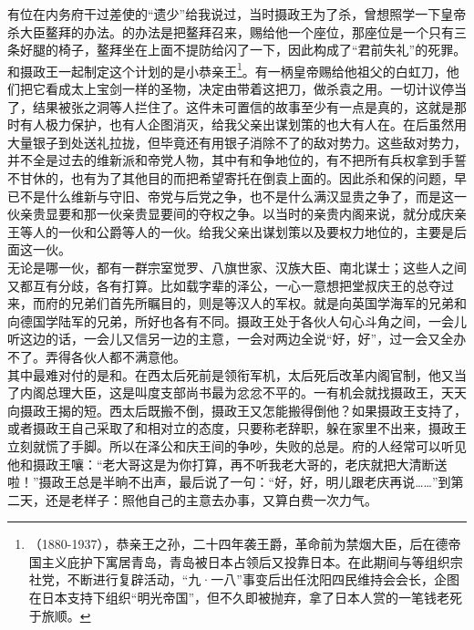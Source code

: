 有位在内务府干过差使的“遗少”给我说过，当时摄政王为了杀，曾想照学一下皇帝杀大臣鳌拜的办法。的办法是把鳌拜召来，赐给他一个座位，那座位是一个只有三条好腿的椅子，鳌拜坐在上面不提防给闪了一下，因此构成了“君前失礼”的死罪。和摄政王一起制定这个计划的是小恭亲王\footnote{（1880-1937），恭亲王之孙，二十四年袭王爵，革命前为禁烟大臣，后在德帝国主义庇护下寓居青岛，青岛被日本占领后又投靠日本。在此期间与等组织宗社党，不断进行复辟活动，“九·一八”事变后出任沈阳四民维持会会长，企图在日本支持下组织“明光帝国”，但不久即被抛弃，拿了日本人赏的一笔钱老死于旅顺。}。有一柄皇帝赐给他祖父的白虹刀，他们把它看成太上宝剑一样的圣物，决定由带着这把刀，做杀袁之用。一切计议停当了，结果被张之洞等人拦住了。这件未可置信的故事至少有一点是真的，这就是那时有人极力保护，也有人企图消灭，给我父亲出谋划策的也大有人在。在后虽然用大量银子到处送礼拉拢，但毕竟还有用银子消除不了的敌对势力。这些敌对势力，并不全是过去的维新派和帝党人物，其中有和争地位的，有不把所有兵权拿到手誓不甘休的，也有为了其他目的而把希望寄托在倒袁上面的。因此杀和保的问题，早已不是什么维新与守旧、帝党与后党之争，也不是什么满汉显贵之争了，而是这一伙亲贵显要和那一伙亲贵显要间的夺权之争。以当时的亲贵内阁来说，就分成庆亲王等人的一伙和公爵等人的一伙。给我父亲出谋划策以及要权力地位的，主要是后面这一伙。\\

无论是哪一伙，都有一群宗室觉罗、八旗世家、汉族大臣、南北谋士；这些人之间又都互有分歧，各有打算。比如载字辈的泽公，一心一意想把堂叔庆王的总夺过来，而府的兄弟们首先所瞩目的，则是等汉人的军权。就是向英国学海军的兄弟和向德国学陆军的兄弟，所好也各有不同。摄政王处于各伙人句心斗角之间，一会儿听这边的话，一会儿又信另一边的主意，一会对两边全说“好，好”，过一会又全办不了。弄得各伙人都不满意他。\\

其中最难对付的是和。在西太后死前是领衔军机，太后死后改革内阁官制，他又当了内阁总理大臣，这是叫度支部尚书最为忿忿不平的。一有机会就找摄政王，天天向摄政王揭的短。西太后既搬不倒，摄政王又怎能搬得倒他？如果摄政王支持了，或者摄政王自己采取了和相对立的态度，只要称老辞职，躲在家里不出来，摄政王立刻就慌了手脚。所以在泽公和庆王间的争吵，失败的总是。府的人经常可以听见他和摄政王嚷：“老大哥这是为你打算，再不听我老大哥的，老庆就把大清断送啦！”摄政王总是半晌不出声，最后说了一句：“好，好，明儿跟老庆再说……”到第二天，还是老样子：照他自己的主意去办事，又算白费一次力气。\\

